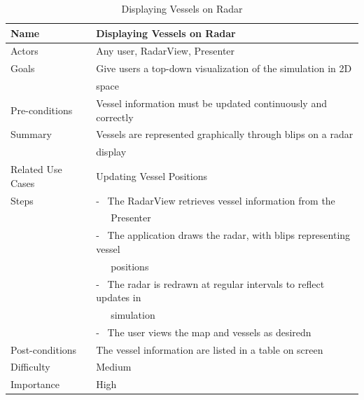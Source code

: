 \documentclass[12pt]{article}
\begin{document}
\begin{table}[ht]
\centering
   \begin{tabular}{|l|l|}
        \hline
        {\large Name} & {\large Displaying Vessels on Radar} \\
        \hline\hline
        Actors & Any user, RadarView, Presenter\\
        \hline
        Goals & Give users a top-down visualization of the simulation in 2D\\ 
         & space\\
        \hline
        Pre-conditions & Vessel information must be updated continuously and correctly\\
        \hline
        Summary & Vessels are represented graphically through blips on a radar\\ 
         & display\\
        \hline
        Related Use Cases & Updating Vessel Positions\\
        \hline
        Steps & - \ The RadarView retrieves vessel information from the\\ 
         & \ \ \ Presenter\\
         & - \ The application draws the radar, with blips representing vessel\\ 
         & \ \ \ positions\\
         & - \ The radar is redrawn at regular intervals to reflect updates in\\ 
         & \ \ \ simulation\\
         & - \ The user views the map and vessels as desiredn\\
        \hline
        Post-conditions & The vessel information are listed in a table on screen\\
        \hline
        Difficulty & Medium\\
        \hline
        Importance & High\\
        \hline
    \end{tabular}
\caption{Displaying Vessels on Radar}
\end{table}
\end{document}

